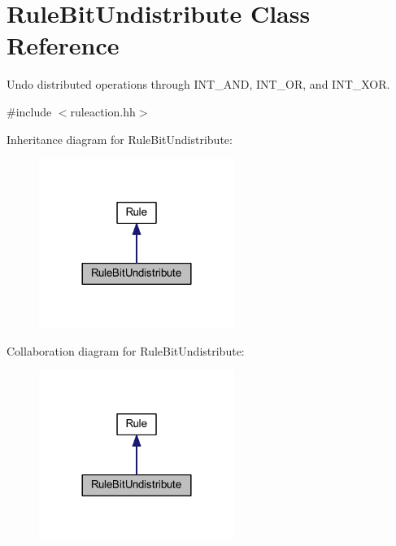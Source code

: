 \hypertarget{class_rule_bit_undistribute}{}\section{Rule\+Bit\+Undistribute Class Reference}
\label{class_rule_bit_undistribute}


Undo distributed operations through I\+N\+T\+\_\+\+A\+ND, I\+N\+T\+\_\+\+OR, and I\+N\+T\+\_\+\+X\+OR.  




{\ttfamily \#include $<$ruleaction.\+hh$>$}



Inheritance diagram for Rule\+Bit\+Undistribute\+:
\nopagebreak
\begin{figure}[H]
\begin{center}
\leavevmode
\includegraphics[width=180pt]{class_rule_bit_undistribute__inherit__graph}
\end{center}
\end{figure}


Collaboration diagram for Rule\+Bit\+Undistribute\+:
\nopagebreak
\begin{figure}[H]
\begin{center}
\leavevmode
\includegraphics[width=180pt]{class_rule_bit_undistribute__coll__graph}
\end{center}
\end{figure}
